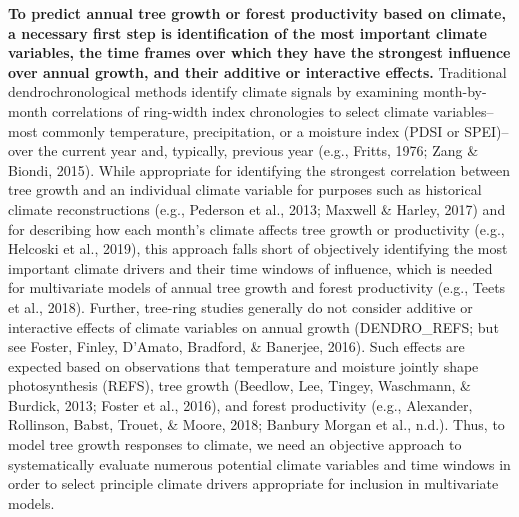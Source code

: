 \documentclass[
]{article}
\begin{document}
\textbf{To predict annual tree growth or forest productivity based on
climate, a necessary first step is identification of the most important
climate variables, the time frames over which they have the strongest
influence over annual growth, and their additive or interactive
effects.} Traditional dendrochronological methods identify climate
signals by examining month-by-month correlations of ring-width index
chronologies to select climate variables--most commonly temperature,
precipitation, or a moisture index (PDSI or SPEI)--over the current year
and, typically, previous year (e.g., Fritts, 1976; Zang \& Biondi,
2015). While appropriate for identifying the strongest correlation
between tree growth and an individual climate variable for purposes such
as historical climate reconstructions (e.g., Pederson et al., 2013;
Maxwell \& Harley, 2017) and for describing how each month's climate
affects tree growth or productivity (e.g., Helcoski et al., 2019), this
approach falls short of objectively identifying the most important
climate drivers and their time windows of influence, which is needed for
multivariate models of annual tree growth and forest productivity (e.g.,
Teets et al., 2018). Further, tree-ring studies generally do not
consider additive or interactive effects of climate variables on annual
growth (DENDRO\_REFS; but see Foster, Finley, D'Amato, Bradford, \&
Banerjee, 2016). Such effects are expected based on observations that
temperature and moisture jointly shape photosynthesis (REFS), tree
growth (Beedlow, Lee, Tingey, Waschmann, \& Burdick, 2013; Foster et
al., 2016), and forest productivity (e.g., Alexander, Rollinson, Babst,
Trouet, \& Moore, 2018; Banbury Morgan et al., n.d.). Thus, to model
tree growth responses to climate, we need an objective approach to
systematically evaluate numerous potential climate variables and time
windows in order to select principle climate drivers appropriate for
inclusion in multivariate models.
\end{document}
